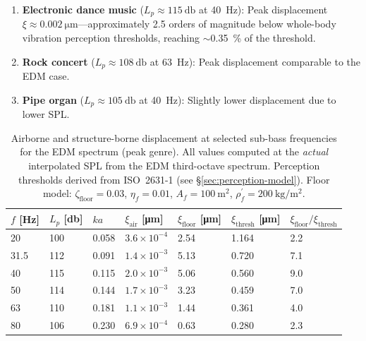 \begin{enumerate}
  \item \textbf{Electronic dance music} ($L_p \approx \SI{115}{\decibel}$
    at \SI{40}{\hertz}):  Peak displacement
    $\xi \approx \SI{0.002}{\micro\metre}$---approximately \num{2.5}
    orders of magnitude below whole-body vibration perception thresholds,
    reaching $\sim$\SI{0.35}{\percent} of the threshold.

  \item \textbf{Rock concert} ($L_p \approx \SI{108}{\decibel}$ at
    \SI{63}{\hertz}):  Peak displacement comparable to the EDM case.

  \item \textbf{Pipe organ} ($L_p \approx \SI{105}{\decibel}$ at
    \SI{40}{\hertz}):  Slightly lower displacement due to lower SPL.
\end{enumerate}

\begin{table}[htbp]
  \centering
  \caption{Airborne and structure-borne displacement at selected
    sub-bass frequencies for the EDM spectrum (peak genre).
    All values computed at the \emph{actual} interpolated SPL from
    the EDM third-octave spectrum.  Perception thresholds derived from
    ISO~2631-1 (see \S\ref{sec:perception-model}).  Floor model:
    $\zeta_\mathrm{floor} = 0.03$, $\eta_f = 0.01$,
    $A_f = \SI{100}{\metre\squared}$,
    $\rho_f^{\prime} = \SI{200}{\kilogram\per\metre\squared}$.}
  \label{tab:displacement}
  \begin{tabular}{@{}lllllll@{}}
    \toprule
    $f$ [\si{\hertz}] & $L_p$ [\si{\decibel}] & $ka$ &
      $\xi_\mathrm{air}$ [\si{\micro\metre}] &
      $\xi_\mathrm{floor}$ [\si{\micro\metre}] &
      $\xi_\mathrm{thresh}$ [\si{\micro\metre}] &
      $\xi_\mathrm{floor}/\xi_\mathrm{thresh}$ \\
    \midrule
    20   & 100 & 0.058 & $3.6 \times 10^{-4}$ & 2.54  & 1.164 & 2.2 \\
    31.5 & 112 & 0.091 & $1.4 \times 10^{-3}$ & 5.13  & 0.720 & 7.1 \\
    40   & 115 & 0.115 & $2.0 \times 10^{-3}$ & 5.06  & 0.560 & 9.0 \\
    50   & 114 & 0.144 & $1.7 \times 10^{-3}$ & 3.23  & 0.459 & 7.0 \\
    63   & 110 & 0.181 & $1.1 \times 10^{-3}$ & 1.44  & 0.361 & 4.0 \\
    80   & 106 & 0.230 & $6.9 \times 10^{-4}$ & 0.63  & 0.280 & 2.3 \\
    \bottomrule
  \end{tabular}
\end{table}

